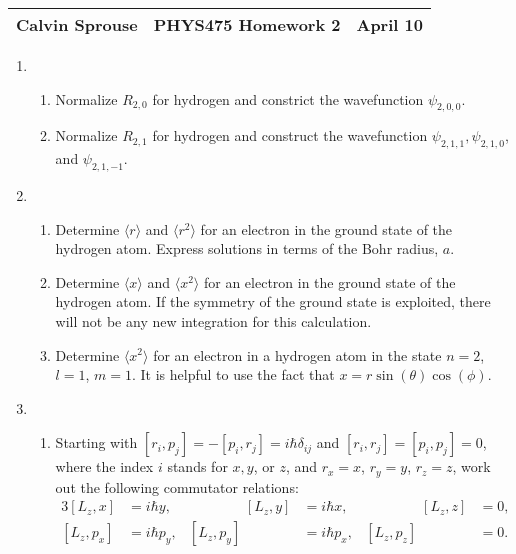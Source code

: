 \documentclass[a4paper, 12pt]{config/homework}
\begin{document}
\noindent
\begin{tabularx}{\textwidth}{>{\centering\arraybackslash}X>{\centering\arraybackslash}X>{\centering\arraybackslash}X}
Calvin Sprouse & PHYS475 Homework 2 & 2024 April 10\\
\midrule
\end{tabularx}

\begin{enumerate}
\item \begin{enumerate}[label=(\alph*)]
\item Normalize \(R_{2,0}\) for hydrogen and constrict the wavefunction \(\psi_{2,0,0}\). \bigskip



\item Normalize \(R_{2,1}\) for hydrogen and construct the wavefunction \(\psi_{2,1,1}, \psi_{2,1,0}\), and \(\psi_{2,1,-1}\). \bigskip



\end{enumerate}
\pagebreak
\item \begin{enumerate}[label=(\alph*)]
\item Determine \(\langle r \rangle\) and \(\langle r^2 \rangle\) for an electron in the ground state of the hydrogen atom. Express solutions in terms of the Bohr radius, \(a\). \bigskip



\item Determine \(\langle x \rangle\) and \(\langle x^2 \rangle\) for an electron in the ground state of the hydrogen atom. If the symmetry of the ground state is exploited, there will not be any new integration for this calculation. \bigskip



\item Determine \(\langle x^2 \rangle\) for an electron in a hydrogen atom in the state \(n=2\), \(l=1\), \(m=1\). It is helpful to use the fact that \(x=r\sin(\theta)\cos(\phi)\). \bigskip



\end{enumerate}
\pagebreak
\item \begin{enumerate}[label=(\alph*)]
\item Starting with \([r_i,p_j]=-[p_i,r_j]=i\hbar\delta_{ij}\) and \([r_i,r_j]=[p_i,p_j]=0\), where the index \(i\) stands for \(x,y\), or \(z\), and \(r_x=x\), \(r_y=y\), \(r_z=z\), work out the following commutator relations:
\begin{alignat*}{3}
[L_z,x] & =i\hbar y, & \qquad\qquad [L_z,y] & =i\hbar x, & \qquad\qquad [L_z,z] & =0, \\
[L_z,p_x]&=i\hbar p_y, & [L_z, p_y]&=i\hbar p_x, & [L_z, p_z]&=0.
\end{alignat*} \bigskip




\end{enumerate}
\end{enumerate}
\end{document}
